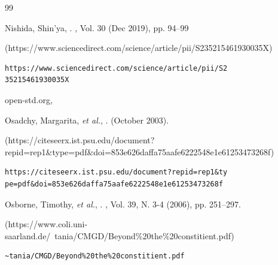 \begin{thebibliography}{99}
{\begin{bItem}[ShinyaNishida]
Nishida, Shin'ya,
.
,
Vol. 30 (Dec 2019), pp. 94--99 
%
\begin{boxurl}(https://www.sciencedirect.com/science/article/pii/S235215461930035X)
\begin{lstlisting}
https://www.sciencedirect.com/science/article/pii/S2
35215461930035X
\end{lstlisting}
\end{boxurl}\end{bItem}


\begin{bItem}[TimurDoumler]
open-std.org,%
{}
%
\end{bItem}




\begin{bItem}[Osadchyetal]
Osadchy, Margarita, \textit{et al.},
.
(October 2003).
%
\begin{boxurl}(https://citeseerx.ist.psu.edu/document?repid=rep1&type=pdf&doi=853e626daffa75aafe6222548e1e61253473268f)
\begin{lstlisting}
https://citeseerx.ist.psu.edu/document?repid=rep1&ty
pe=pdf&doi=853e626daffa75aafe6222548e1e61253473268f
\end{lstlisting}
\end{boxurl}\end{bItem}




\begin{bItem}[TimothyOsborne]
Osborne, Timothy, \textit{et al.},
.
,
Vol. 39, N. 3-4 (2006), pp. 251--297. 
%
\begin{boxurl}(https://www.coli.uni-saarland.de/~tania/CMGD/Beyond\%20the\%20constitient.pdf)
\begin{lstlisting}
~tania/CMGD/Beyond%20the%20constitient.pdf
\end{lstlisting}
\end{boxurl}\end{bItem}







}
\end{thebibliography}
